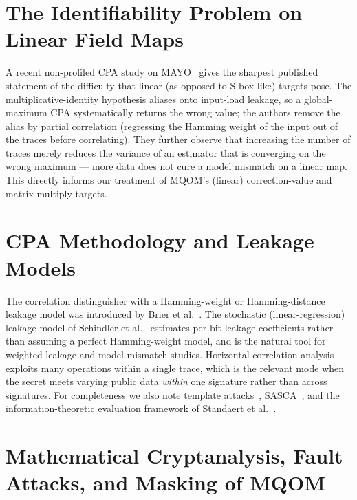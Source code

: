 \section{The Identifiability Problem on Linear Field Maps}

A recent non-profiled CPA study on MAYO~\cite{lampropoulou2026} gives the sharpest
published statement of the difficulty that linear (as opposed to S-box-like) targets
pose. The multiplicative-identity hypothesis aliases onto input-load leakage, so a
global-maximum CPA systematically returns the wrong value; the authors remove the alias
by partial correlation (regressing the Hamming weight of the input out of the traces
before correlating). They further observe that increasing the number of traces merely
reduces the variance of an estimator that is converging on the wrong maximum --- more
data does not cure a model mismatch on a linear map. This directly informs our
treatment of MQOM's (linear) correction-value and matrix-multiply targets.

\section{CPA Methodology and Leakage Models}

The correlation distinguisher with a Hamming-weight or Hamming-distance leakage model
was introduced by Brier et al.~\cite{brier2004cpa}. The stochastic (linear-regression)
leakage model of Schindler et al.~\cite{schindler2005stochastic} estimates per-bit
leakage coefficients rather than assuming a perfect Hamming-weight model, and is the
natural tool for weighted-leakage and model-mismatch studies. Horizontal correlation
analysis~\cite{clavier2010horizontal} exploits many operations within a single trace,
which is the relevant mode when the secret meets varying public data \emph{within} one
signature rather than across signatures. For completeness we also note template
attacks~\cite{chari2002templates}, SASCA~\cite{veyrat2014sasca}, and the
information-theoretic evaluation framework of Standaert et al.~\cite{standaert2009}.

\section{Mathematical Cryptanalysis, Fault Attacks, and Masking of MQOM}

